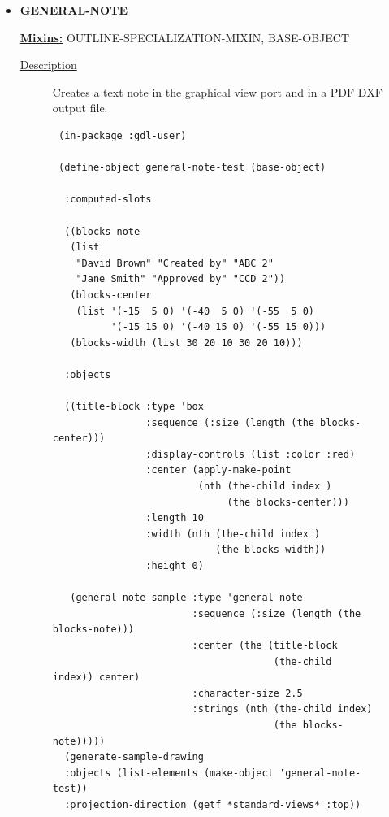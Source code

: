 \documentclass [11pt]{book}
\begin{document}
\begin{itemize}
\item {}
\label{prim:general-note}
\textbf{GENERAL-NOTE}


\textbf{
\underline{Mixins:}} OUTLINE-SPECIALIZATION-MIXIN, BASE-OBJECT





\begin{description}

\item [
\underline{Description}]


Creates a text note in the graphical view port and in a PDF DXF output file.



\end{description}




\begin{figure}
\begin{lrbox}{\boxedverb}
\begin{minipage}{\linewidth}
{\small

\begin{verbatim} 
 (in-package :gdl-user)

 (define-object general-note-test (base-object)
  
  :computed-slots
  
  ((blocks-note 
   (list
    "David Brown" "Created by" "ABC 2"
    "Jane Smith" "Approved by" "CCD 2"))
   (blocks-center 
    (list '(-15  5 0) '(-40  5 0) '(-55  5 0)
          '(-15 15 0) '(-40 15 0) '(-55 15 0)))
   (blocks-width (list 30 20 10 30 20 10)))
  
  :objects 
  
  ((title-block :type 'box
                :sequence (:size (length (the blocks-center)))
                :display-controls (list :color :red)
                :center (apply-make-point 
                         (nth (the-child index ) 
                              (the blocks-center)))
                :length 10
                :width (nth (the-child index ) 
                            (the blocks-width))
                :height 0)

   (general-note-sample :type 'general-note
                        :sequence (:size (length (the blocks-note)))
                        :center (the (title-block 
                                      (the-child index)) center)
                        :character-size 2.5
                        :strings (nth (the-child index) 
                                      (the blocks-note)))))
  (generate-sample-drawing 
  :objects (list-elements (make-object 'general-note-test)) 
  :projection-direction (getf *standard-views* :top))



\end{verbatim}}
\end{minipage}
\end{lrbox}
\end{figure}
\end{itemize}
\end{document}
